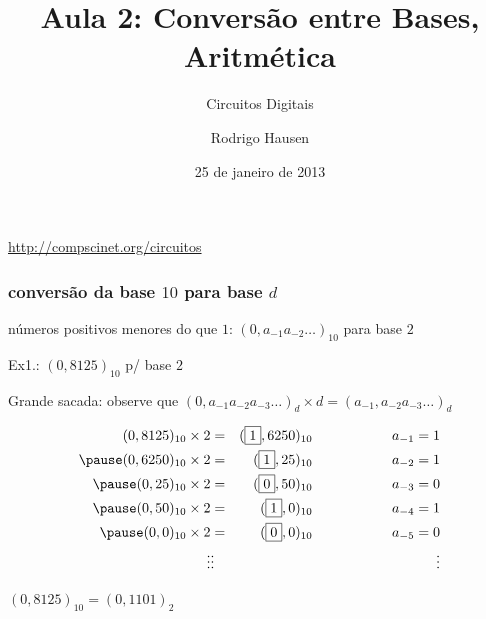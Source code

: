 \documentclass{beamer}
\title{Aula 2: Conversão entre Bases, Aritmética}
\subtitle{Circuitos Digitais}
\author{Rodrigo Hausen}
\institute{CMCC -- UFABC}
\date{25 de janeiro de 2013}
\begin{document}
\begin{frame}
\maketitle

\vspace{-1cm}

\begin{center}
\url{http://compscinet.org/circuitos}
\end{center}

\end{frame}


\begin{frame}
\frametitle{conversão da base $10$ para base $d$}

números positivos menores do que $1$: $(0,a_{-1} a_{-2} \ldots)_{10}$ para base $2$

Ex1.: $(0,8125)_{10}$ p/ base $2$

\pause

\vspace{12pt}

Grande sacada: observe que $(0,a_{-1} a_{-2} a_{-3} \ldots)_d \times d = (a_{-1}, a_{-2} a_{-3} \ldots)_d$

\pause

\begin{eqnarray*}
(0,8125)_{10} \times 2 & = & (\fbox{1},6250)_{10} \hspace{2cm} a_{-1} = 1\\
\pause
(0,6250)_{10} \times 2 & = & (\fbox{1},25)_{10} \hspace{2cm} a_{-2} = 1\\
\pause
(0,25)_{10} \times 2 & = & (\fbox{0},50)_{10} \hspace{2cm} a_{-3} = 0\\
\pause
(0,50)_{10} \times 2 & = & (\fbox{1},0)_{10} \hspace{2cm} a_{-4} = 1\\
\pause
(0,0)_{10} \times 2 & = & (\fbox{0},0)_{10} \hspace{2cm} a_{-5} = 0\\
\vdots & \vdots & \vdots
\end{eqnarray*}

$(0,8125)_{10} = (0,1101)_2$
\end{frame}

\end{document}
